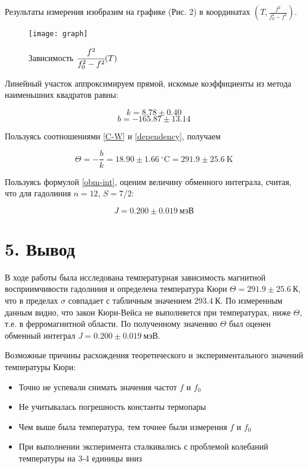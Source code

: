 \documentclass[a4paper,12pt]{report}
\begin{document}
Результаты измерения изобразим на графике (Рис. 2) в координатах $\left( T, \frac{f^2}{f_0^2-f^2}\right)$.

\begin{figure}[H]
    \centering
    \texttt{[image: graph]}
    \caption{Зависимость $\cfrac{f^2}{f_0^2-f^2}(T)$}
\end{figure}

Линейный участок аппроксимируем прямой, искомые коэффициенты из метода наименьшних квадратов равны:

\[k = 8.78 \pm 0.40\]
\[b = -165.87 \pm 13.14\]

Пользуясь соотношениями \eqref{C-W} и \eqref{dependency}, получаем

\[\Theta = -\dfrac{b}{k} = 18.90 \pm 1.66~\text{$^\circ$C} = 291.9 \pm 25.6~\text{K}\]

Пользуясь формулой \eqref{obm-int}, оценим величину обменного интеграла, считая, что для гадолиния $n = 12$, $S = 7/2$:

\[J = 0.200\pm 0.019~\text{мэВ}\]


\section*{5. Вывод}
В ходе работы была исследована температурная зависимость магнитной восприимчивости гадолиния и определена температура Кюри $\Theta = 291.9 \pm 25.6~\text{К}$, что в пределах $\sigma$ совпадает с табличным значением $293.4~\text{К}$. По измеренным данным видно, что закон Кюри-Вейса не выполняется при температурах, ниже $\Theta$, т.е. в ферромагнитной области. По полученному значению $\Theta$ был оценен обменный интеграл $J = 0.200\pm 0.019~\text{мэВ}$.

Возможные причины расхождения теоретического и экспериментального значений температуры Кюри:
\begin{itemize}
    \item Точно не успевали снимать значения частот $f$ и $f_{0}$
    \item Не учитывалась погрешность константы термопары
    \item Чем выше была температура, тем точнее были измерения $f$ и $f_{0}$
    \item При выполнении эксперимента сталкивались с проблемой колебаний температуры на 3-4 единицы вниз
\end{itemize}
\end{document}
